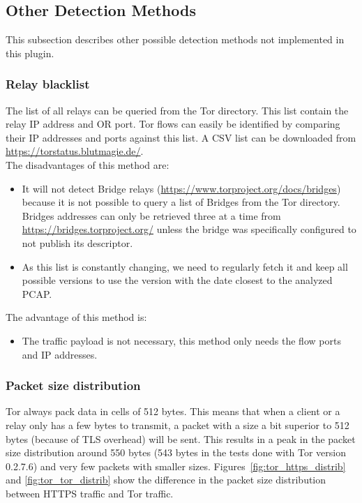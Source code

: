\documentclass[documentation]{subfiles}
\begin{document}
\subsection{Other Detection Methods}

This subsection describes other possible detection methods not implemented in this plugin.

\subsubsection{Relay blacklist}

The list of all relays can be queried from the Tor directory. This list contain the relay IP address and
OR port. Tor flows can easily be identified by comparing their IP addresses and ports against this list.
A CSV list can be downloaded from \url{https://torstatus.blutmagie.de/}.\\

The disadvantages of this method are:
\begin{itemize}
    \item It will not detect Bridge relays (\url{https://www.torproject.org/docs/bridges}) because
        it is not possible to query a list of Bridges from the Tor directory.
        Bridges addresses can only be retrieved three at a time from
        \url{https://bridges.torproject.org/} unless the bridge was specifically configured to not
        publish its descriptor.
    \item As this list is constantly changing, we need to regularly fetch it and keep all possible
        versions to use the version with the date closest to the analyzed PCAP.
\end{itemize}

The advantage of this method is:
\begin{itemize}
    \item The traffic payload is not necessary, this method only needs the flow ports and IP addresses.
\end{itemize}

\subsubsection{Packet size distribution}

Tor always pack data in cells of 512 bytes. This means that when a client or a relay only has a few
bytes to transmit, a packet with a size a bit superior to 512 bytes (because of TLS overhead)
will be sent. This results in a peak in the packet size distribution around 550 bytes
(543 bytes in the tests done with Tor version 0.2.7.6) and very few packets with smaller sizes.
Figures~\ref{fig:tor_https_distrib} and \ref{fig:tor_tor_distrib} show the difference in the packet
size distribution between HTTPS traffic and Tor traffic.\\
\end{document}
